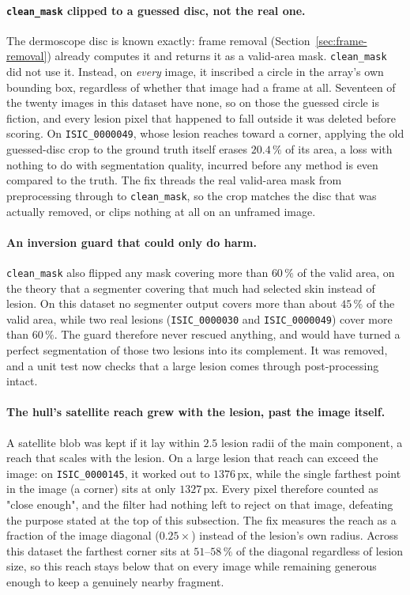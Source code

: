 \documentclass[11pt,a4paper]{article}
\begin{document}
\paragraph{\texttt{clean\_mask} clipped to a guessed disc, not the real one.}
The dermoscope disc is known exactly: frame removal (Section~\ref{sec:frame-removal}) already
computes it and returns it as a valid-area mask. \texttt{clean\_mask} did not
use it. Instead, on \emph{every} image, it inscribed a circle in the array's
own bounding box, regardless of whether that image had a frame at all.
Seventeen of the twenty images in this dataset have none, so on those the
guessed circle is fiction, and every lesion pixel that happened to fall
outside it was deleted before scoring. On \texttt{ISIC\_0000049}, whose lesion
reaches toward a corner, applying the old guessed-disc crop to the ground
truth itself erases $20.4\,\%$ of its area, a loss with nothing to do with
segmentation quality, incurred before any method is even compared to the
truth. The fix threads the real valid-area mask from preprocessing through to
\texttt{clean\_mask}, so the crop matches the disc that was actually removed,
or clips nothing at all on an unframed image.

\paragraph{An inversion guard that could only do harm.} \texttt{clean\_mask}
also flipped any mask covering more than $60\,\%$ of the valid area, on the
theory that a segmenter covering that much had selected skin instead of
lesion. On this dataset no segmenter output covers more than about $45\,\%$ of
the valid area, while two real lesions (\texttt{ISIC\_0000030} and
\texttt{ISIC\_0000049}) cover more than $60\,\%$. The guard therefore never
rescued anything, and would have turned a perfect segmentation of those two
lesions into its complement. It was removed, and a unit test now checks that
a large lesion comes through post-processing intact.

\paragraph{The hull's satellite reach grew with the lesion, past the image
itself.} A satellite blob was kept if it lay within $2.5$ lesion radii of the
main component, a reach that scales with the lesion. On a large lesion that
reach can exceed the image: on \texttt{ISIC\_0000145}, it worked out to
$1376$\,px, while the single farthest point in the image (a corner) sits at
only $1327$\,px. Every pixel therefore counted as "close enough", and the
filter had nothing left to reject on that image, defeating the purpose stated
at the top of this subsection. The fix measures the reach as a fraction of the
image diagonal ($0.25\times$) instead of the lesion's own radius. Across this
dataset the farthest corner sits at $51$–$58\,\%$ of the diagonal regardless of
lesion size, so this reach stays below that on every image while remaining
generous enough to keep a genuinely nearby fragment.
\end{document}
